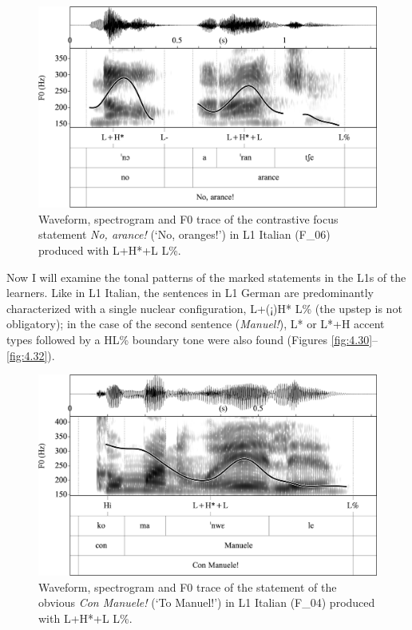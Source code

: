 \begin{figure}


\includegraphics[width=\textwidth]{figures/Figure_4.27.png}


\caption{Waveform, spectrogram and F0 trace of the contrastive focus statement \textit{No, arance!} (‘No, oranges!’) in L1 Italian \mbox{(F\_06)} produced with L+H*+L L\%.}
\label{fig:4.27}
\end{figure}

Now I will examine the tonal patterns of the marked statements in the L1s of the learners. Like in L1 Italian, the sentences in L1 German are predominantly characterized with a single nuclear configuration, L+(¡)H* L\% (the upstep is not obligatory); in the case of the second sentence (\textit{Manuel!}), L* or L*+H accent types followed by a HL\% boundary tone were also found (Figures \ref{fig:4.30}--\ref{fig:4.32}).\pagebreak

\begin{figure}
\includegraphics[width=\textwidth]{figures/Figure_4.28.png}
\caption{Waveform, spectrogram and F0 trace of the statement of the obvious \textit{Con Manuele!} (‘To Manuel!’) in L1 Italian \mbox{(F\_04)} produced with L+H*+L L\%.}
\label{fig:4.28}
\end{figure}

